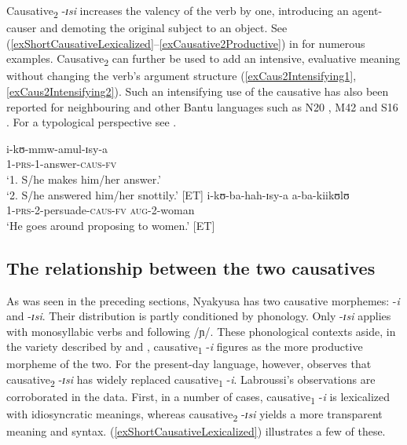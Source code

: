 Causative\textsubscript{2} -\textit{ɪsi} increases the valency of the verb by one, introducing an agent-causer and demoting the original subject to an object. See (\ref{exShortCausativeLexicalized}--\ref{exCausative2Productive}) in  for numerous examples. Causative\textsubscript{2} can further be used to add an intensive, evaluative meaning without changing the verb's argument structure (\ref{exCaus2Intensifying1}, \ref{exCaus2Intensifying2}). Such an intensifying use of the causative has also been reported for neighbouring  \citep[73f]{BotneR2003} and other Bantu languages such as  N20 \citep[78f]{IntensiveChichewa},  M42 \citep[83--92]{vanSambeekJ1955} and  S16 \citep[397]{MathangwaneJ2001}. For a typological perspective see \citet{KittilaeS2009}.
\begin{exe}
\ex \label{exCaus2Intensifying1}\gll i-kʊ-mmw-amul-ɪsy-a\\
1-\textsc{prs}-1-answer-\textsc{caus}-\textsc{fv}\\
\glt `1. S/he makes him/her answer.'\\
`2. S/he answered him/her snottily.' [ET]
\ex \label{exCaus2Intensifying2}\gll i-kʊ-ba-hah-ɪsy-a a-ba-kiikʊlʊ\\
1-\textsc{prs}-2-persuade-\textsc{caus}-\textsc{fv} \textsc{aug}-2-woman\\
\glt `He goes around proposing to women.' [ET]
\end{exe}

\subsection{The relationship between the two causatives}
\label{TwoCausatives}
As was seen in the preceding sections, Nyakyusa has two causative morphemes: -\textit{i} and -\textit{ɪsi}. Their distribution is partly conditioned by phonology. Only -\textit{ɪsi} applies with monosyllabic verbs and following /ɲ/. These phonological contexts aside, in the variety described by \citet{SchumannK1899} and \citet{EndemannC1914}, causative\textsubscript{1} -\textit{i} figures as the more productive morpheme of the two. For the present-day language, however, \citet{LabroussiC1999} observes that causative\textsubscript{2} -\textit{ɪsi} has widely replaced causative\textsubscript{1} -\textit{i}. Labroussi's observations are corroborated in the data. First, in a number of cases, causative\textsubscript{1} -\textit{i} is lexicalized with idiosyncratic meanings, whereas causative\textsubscript{2} -\textit{ɪsi} yields a more transparent meaning and syntax. (\ref{exShortCausativeLexicalized}) illustrates a few of these.

